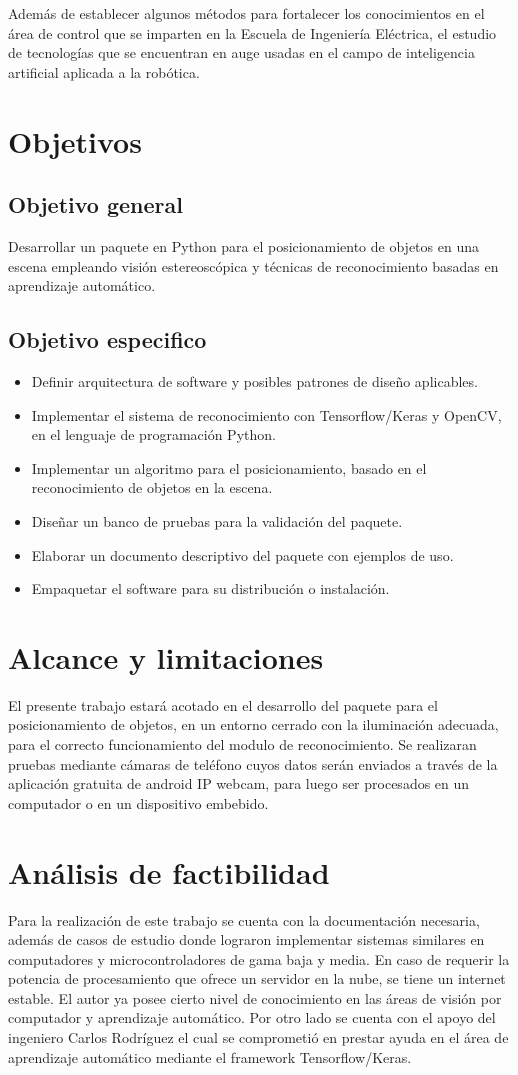 Además de establecer algunos métodos para fortalecer los conocimientos en el área de control  que se imparten en la Escuela de Ingeniería Eléctrica, el estudio de tecnologías que se encuentran en auge usadas en el campo de inteligencia artificial aplicada a la robótica. 
\section{Objetivos}
\subsection{Objetivo general}
Desarrollar un paquete en Python para el posicionamiento de objetos en una escena empleando visión estereoscópica y técnicas de reconocimiento basadas en aprendizaje automático.
\subsection{Objetivo especifico}
\begin{itemize}
    \item Definir arquitectura de software y posibles patrones de diseño aplicables.
    \item Implementar el sistema de reconocimiento con Tensorflow/Keras y OpenCV, en el lenguaje de programación Python.
    \item Implementar un algoritmo para el posicionamiento, basado en el reconocimiento de objetos en la escena.
    \item Diseñar un banco de pruebas para la validación del paquete.
    \item Elaborar un documento descriptivo del paquete con ejemplos de uso.
    \item Empaquetar el software para su distribución o instalación.
\end{itemize}
\section{Alcance y limitaciones}
El presente trabajo estará acotado en el desarrollo del paquete para el posicionamiento de objetos, en un entorno cerrado con la iluminación adecuada, para el correcto funcionamiento del modulo de reconocimiento. Se realizaran pruebas mediante cámaras de teléfono cuyos datos serán enviados a través de la aplicación gratuita de android IP webcam, para luego ser procesados en un computador o en un dispositivo embebido.
\section{Análisis de factibilidad}
Para la realización de este trabajo se cuenta con la documentación necesaria, además de casos de estudio donde lograron implementar sistemas similares en computadores y microcontroladores de gama baja y media. En caso de requerir la potencia de procesamiento que ofrece un servidor en la nube, se tiene un internet estable. El autor ya posee cierto nivel de conocimiento en las áreas de visión por computador y aprendizaje automático. Por otro lado se cuenta con el apoyo del ingeniero Carlos Rodríguez el cual se comprometió en prestar ayuda en el área de aprendizaje automático mediante el framework Tensorflow/Keras.

